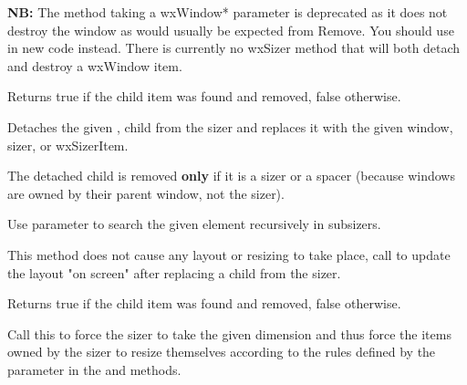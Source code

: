 {\bf NB:} The method taking a wxWindow* parameter is deprecated as it does not
destroy the window as would usually be expected from Remove.  You should use 
 in new code instead.  There is
currently no wxSizer method that will both detach and destroy a wxWindow item.

Returns true if the child item was found and removed, false otherwise.


\label{wxsizerreplace}




Detaches the given ,  child from the sizer and 
replaces it with the given window, sizer, or wxSizerItem.

The detached child is removed {\bf only} if it is a sizer or a spacer
(because windows are owned by their parent window, not the sizer).

Use parameter  to search the given element recursively in subsizers.


This method does not cause any layout or resizing to take place, call
 to update the layout "on screen" after replacing a
child from the sizer.

Returns true if the child item was found and removed, false otherwise.


\label{wxsizersetdimension}


Call this to force the sizer to take the given dimension and thus force the items owned
by the sizer to resize themselves according to the rules defined by the parameter in the 
 and  methods.


\label{wxsizersetminsize}



